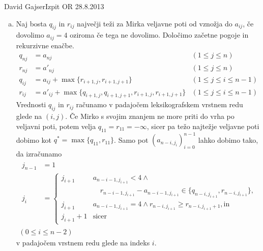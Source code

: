 \begin{naloga}{David Gajser}{Izpit OR 28.8.2013}
\begin{odgovor}
\begin{enumerate}[(a)]
\item Naj bosta $q_{ij}$ in $r_{ij}$
največji teži za Mirka veljavne poti od vznožja do $a_{ij}$,
če dovolimo $a_{ij} = 4$ oziroma če tega ne dovolimo.
Določimo začetne pogoje in rekurzivne enačbe.
\begin{align*}
q_{nj} &= a_{nj} & (1 \le j \le n) \\
r_{nj} &= a'_{nj} & (1 \le j \le n) \\
q_{ij} &= a_{ij} + \max\{r_{i+1,j}, r_{i+1,j+1}\} & (1 \le j \le i \le n-1) \\
r_{ij} &= a'_{ij} + \max\{q_{i+1,j}, q_{i+1,j+1}, r_{i+1,j}, r_{i+1,j+1}\}
& (1 \le j \le i \le n-1)
\end{align*}
Vrednosti $q_{ij}$ in $r_{ij}$ računamo
v padajočem leksikografskem vrstnem redu glede na $(i, j)$.
Če Mirko s svojim znanjem ne more priti do vrha po veljavni poti,
potem velja $q_{11} = r_{11} = -\infty$,
sicer pa težo najtežje veljavne poti
dobimo kot $q^* = \max\{q_{11}, r_{11}\}$.
Samo pot $(a_{n-i, j_i})_{i=0}^{n-1}$ lahko dobimo tako,
da izračunamo
\begin{multline*}
\begin{aligned}
j_{n-1} &= 1 \\
j_i &= \begin{cases}
j_{i+1} & a_{n-i-1,j_{i+1}} < 4 \land {} \\[-1mm]
&\quad r_{n-i-1,j_{i+1}} - a_{n-i-1,j_{i+1}} \in \{q_{n-i,j_{i+1}}, r_{n-i,j_{i+1}}\}, \\
j_{i+1} & a_{n-i-1,j_{i+1}} = 4 \land r_{n-i,j_{i+1}} \ge r_{n-i,j_{i+1}+1},
\text{in} \\
j_{i+1} + 1 & \text{sicer}
\end{cases}
\end{aligned} \\
(0 \le i \le n-2)
\end{multline*}
v padajočem vrstnem redu glede na indeks $i$.
\end{enumerate}
\end{odgovor}
\end{naloga}
